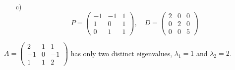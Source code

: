 {\begin{enumerate}
$$\begin{pmatrix}
        \end{pmatrix}$$ 
        A vector that is a basis for the eigenspace is $$v_3 = \begin{pmatrix} 1\\1\\1\end{pmatrix}$$ But any non-zero multiple is also ok. 
        \item[c)] $$P = \begin{pmatrix} -1&-1&1\\1&0&1\\0&1&1\end{pmatrix}, \quad D = \begin{pmatrix} 2&0&0\\0&2&0\\0&0&5\end{pmatrix}$$
    \end{enumerate}
    } \fi
\fi    



\begin{comment}
311 
464
113 

has eigenvalues 8 2 2 .  
\end{comment}



\ifnum {}
    \question[3] $A = \begin{pmatrix}2&1&1\\-1&0&-1\\1&1&2 \end{pmatrix}$ has only two distinct eigenvalues, $\lambda_1 = 1$ and $\lambda_2 = 2$.   

